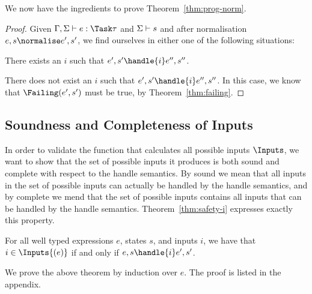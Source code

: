 We now have the ingredients to prove Theorem~\ref{thm:prog-norm}.

\begin{proof}
  Given $\Gamma,\Sigma\infers e:\Task\tau$ and $\Sigma\vdash s$ and after
  normalisation $e,s \normalise e',s'$, we find ourselves in either one of the
  following situations:

  There exists an $i$ such that $e',s'\handle{i} e'',s''$.

  There does not exist an $i$ such that $e',s'\handle{i} e'',s''$. In this case, we
  know that $\Failing(e',s')$ must be true, by Theorem~\ref{thm:failing}.
\end{proof}



\subsection{Soundness and Completeness of Inputs}

In order to validate the function that calculates all possible inputs $\Inputs$,
we want to show that the set of possible inputs it produces is both sound and
complete with respect to the handle semantics. By sound we mean that all inputs
in the set of possible inputs can actually be handled by the handle semantics,
and by complete we mend that the set of possible inputs contains all inputs
that can be handled by the handle semantics. Theorem~\ref{thm:safety-i} expresses
exactly this property.

\begin{theorem}
  For all well typed expressions $e$, states $s$, and inputs $i$,
  we have that $i \in \Inputs{(e)}$ if and only if $e,s \handle{i} e',s'$.
  \label{thm:safety-i}
\end{theorem}

We prove the above theorem by induction over $e$. The proof is listed in the
appendix.
